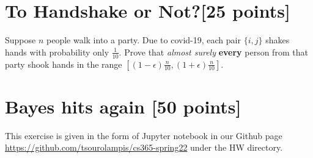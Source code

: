 \section{To Handshake or Not?[25 points]} 

Suppose $n$ people walk into a party. Due to covid-19, each pair $\{i,j\}$ shakes hands with probability only $\frac{1}{10}$. Prove that {\it almost surely} {\bf every} person from that party shook hands in the range $[ (1-\epsilon)\frac{n}{10}, (1+\epsilon)\frac{n}{10}]$. 


\section{Bayes hits again [50 points]}

This exercise is given in the form of Jupyter notebook in our Github page \url{https://github.com/tsourolampis/cs365-spring22} under the HW directory.

 
 


